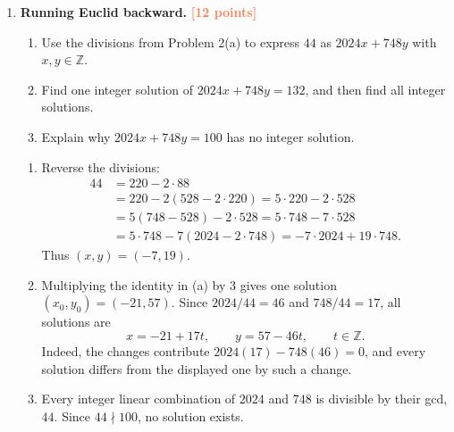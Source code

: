 \documentclass[11pt]{article}
\newcommand{\Z}{\mathbb Z}
\newcommand{\ndivides}{\nmid}
\newcommand{\points}[1]{\hfill\textcolor{coral}{\small\bfseries[#1 points]}}
\begin{document}
\begin{enumerate}
\begin{solution}
\begin{enumerate}
  \item
  \begin{align*}
  4181&=1\cdot2584+1597,&2584&=1\cdot1597+987,\\
  1597&=1\cdot987+610,&987&=1\cdot610+377,\\
  610&=1\cdot377+233,&377&=1\cdot233+144,\\
  233&=1\cdot144+89,&144&=1\cdot89+55,\\
  89&=1\cdot55+34,&55&=1\cdot34+21,\\
  34&=1\cdot21+13,&21&=1\cdot13+8,\\
  13&=1\cdot8+5,&8&=1\cdot5+3,\\
  5&=1\cdot3+2,&3&=1\cdot2+1,\\
  2&=2\cdot1.
  \end{align*}
  Therefore $\gcd(4181,2584)=1$. The remainders run backward through the
  Fibonacci numbers; each quotient before the last is $1$.
\end{enumerate}
\end{solution}

\item \textbf{Running Euclid backward.} \points{12}
\begin{enumerate}
  \item Use the divisions from Problem 2(a) to express $44$ as
  $2024x+748y$ with $x,y\in\Z$.
  \item Find one integer solution of $2024x+748y=132$, and then find all
  integer solutions.
  \item Explain why $2024x+748y=100$ has no integer solution.
\end{enumerate}
\begin{solution}
\begin{enumerate}
  \item Reverse the divisions:
  \begin{align*}
  44&=220-2\cdot88\\
    &=220-2(528-2\cdot220)=5\cdot220-2\cdot528\\
    &=5(748-528)-2\cdot528=5\cdot748-7\cdot528\\
    &=5\cdot748-7(2024-2\cdot748)
      =-7\cdot2024+19\cdot748.
  \end{align*}
  Thus $(x,y)=(-7,19)$.
  \item Multiplying the identity in (a) by $3$ gives one solution
  $(x_0,y_0)=(-21,57)$. Since $2024/44=46$ and $748/44=17$, all solutions are
  \[
    x=-21+17t,\qquad y=57-46t,\qquad t\in\Z.
  \]
  Indeed, the changes contribute $2024(17)-748(46)=0$, and every solution
  differs from the displayed one by such a change.
  \item Every integer linear combination of $2024$ and $748$ is divisible by
  their gcd, $44$. Since $44\ndivides100$, no solution exists.
\end{enumerate}
\end{solution}


\end{enumerate}
\end{document}
